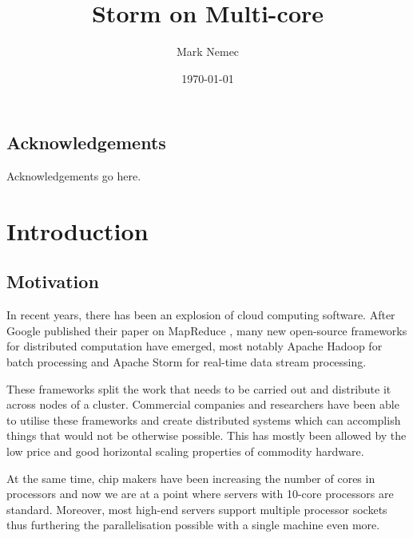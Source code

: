 \documentclass[bsc,logo,frontabs,twoside,singlespacing,normalheadings,parskip]{infthesis}\usepackage[]{graphicx}\usepackage[]{color}
\begin{document}
\title{Storm on Multi-core}
\author{Mark Nemec}

\date{\today}


\maketitle

\section*{Acknowledgements}
Acknowledgements go here.

\tableofcontents
\listoffigures
\listoftables
\listoflistings




\clearpage{}\chapter{Introduction}

\section{Motivation}

In recent years, there has been an explosion of cloud computing software. After Google published their paper on MapReduce \citep{dean2010mapreduce}, many new open-source frameworks for distributed computation have emerged, most notably Apache Hadoop \citep{ApacheHadoop} for batch processing and Apache Storm \citep{ApacheStorm} for real-time data stream processing.

These frameworks split the work that needs to be carried out and distribute it across nodes of a cluster. Commercial companies and researchers have been able to utilise these frameworks and create distributed systems which can accomplish things that would not be otherwise possible. This has mostly been allowed by the low price and good horizontal scaling properties of commodity hardware.


At the same time, chip makers have been increasing the number of cores in processors and now we are at a point where servers with 10-core processors are standard. Moreover, most high-end servers support multiple processor sockets thus furthering the parallelisation possible with a single machine even more.
\end{document}
